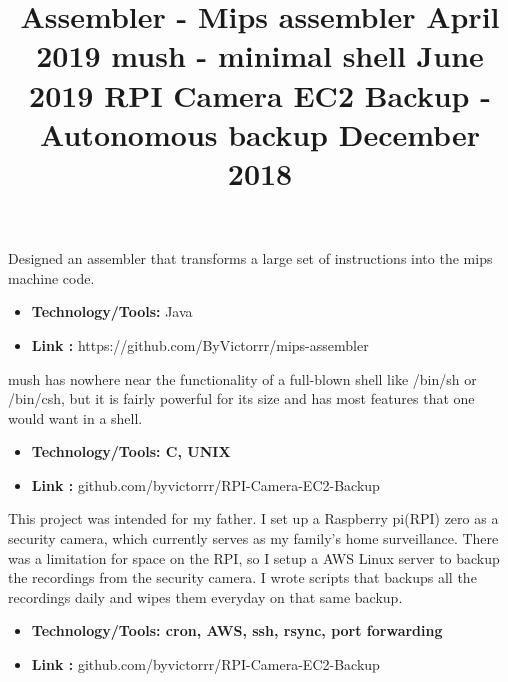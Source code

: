 \documentclass[margin]{res}
\begin{document}
\begin{resume}
{%
\location{}
\title{\textbf{Assembler - Mips assembler \hfill April 2019}}
\begin{position}
Designed an assembler that transforms a large set of instructions into the mips machine code.
\begin{itemize}
\item \textbf{Technology/Tools:} Java
\end{itemize}
\begin{itemize}
\item \textbf{Link :} https://github.com/ByVictorrr/mips-assembler
\end{itemize}
\end{position}



\location{}
\title{\textbf{ mush - minimal shell  \hfill June 2019}}
\begin{position}
mush has nowhere near the functionality of a full-blown shell like /bin/sh or /bin/csh, but it is fairly powerful for its size and has most features that one would want in a shell.
\begin{itemize}
\item \textbf{Technology/Tools: C, UNIX}
\end{itemize}
\begin{itemize}
\item \textbf{Link :} github.com/byvictorrr/RPI-Camera-EC2-Backup
\end{itemize}
\end{position}



\location{}
\title{\textbf{ RPI Camera EC2 Backup - Autonomous backup  \hfill December 2018}}
\begin{position}
This project was intended for my father. I set up a Raspberry pi(RPI) zero as a security camera, which currently serves as my family’s home surveillance. There was a limitation for space on the RPI, so I setup a AWS Linux server to backup the recordings from the security camera. I wrote scripts that backups all the recordings daily and wipes them everyday on that same backup.
\begin{itemize}
\item \textbf{Technology/Tools: cron, AWS, ssh, rsync, port forwarding}
\end{itemize}
\begin{itemize}
\item \textbf{Link :} github.com/byvictorrr/RPI-Camera-EC2-Backup
\end{itemize}
\end{position}


}
\end{resume}
\end{document}
